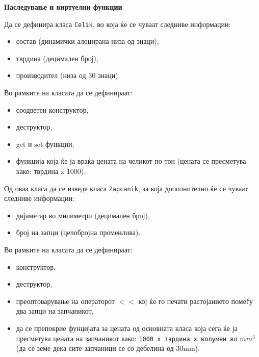 \documentclass[12pt,a4paper]{exam}
\begin{document}
\pagestyle{headandfoot}
\headrule
{}
\begin{center}
\Large{\textbf{Наследување и виртуелни функции}}
\end{center}
\begin{questions}

\question
Да се дефинира класа \texttt{Celik}, во која ќе се чуваат следниве информации:
\begin{itemize}
  \item состав (динамички алоцирана низа од знаци),
  \item тврдина (децимален број),
  \item производител (низа од 30 знаци).
\end{itemize}
Во рамките на класата да се дефинираат:
\begin{itemize}
  \item соодветен конструктор,
  \item деструктор,
  \item get и set функции,
  \item функција која ќе ја враќа цената на челикот по тон (цената се пресметува
  како: тврдина x 1000).
\end{itemize}

Од оваа класа да се изведе класа \texttt{Zapcanik}, за која дополнително ќе се
чуваат следниве информации:
\begin{itemize}
  \item дијаметар во милиметри (децимален број),
  \item број на запци (целобројна променлива).
\end{itemize}
Во рамките на класата да се дефинираат:
\begin{itemize}
  \item конструктор,
  \item деструктор,
  \item преоптоварување на операторот $<<$ кој ќе го печати растојанието
помеѓу два запци на запчаникот,
\item да се препокрие фунцијата за цената од основната класа која сега ќе ја
пресметува цената на запчаникот како: \texttt{1000 x тврдина x волумен во}
$mm^3$ (да се земе дека сите запчаници се со дебелина од 30mm).
\end{itemize}


\end{questions}
\end{document}
